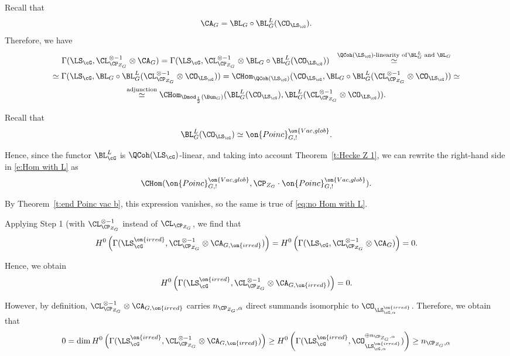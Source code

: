 \documentclass[9pt]{amsart}
\theoremstyle{remark}
\theoremstyle{definition}
\theoremstyle{remark}
\newcommand{\thmref}[1]{Theorem~\ref{#1}}
\numberwithin{equation}{section}
\begin{document}
\medskip 

Recall that
$$\CA_G = \BL_G\circ \BL_G^L(\CO_{\LS_\cG}).$$
Therefore, we have
\begin{multline} \label{e:Hom with L}
\Gamma(\LS_\cG,\CL^{\otimes -1}_{\CP_{Z_G}}\otimes \CA_G)=
\Gamma(\LS_\cG,\CL^{\otimes -1}_{\CP_{Z_G}}\otimes \BL_G\circ \BL_G^L(\CO_{\LS_\cG}))\,\,\,\,\overset{\QCoh(\LS_\cG)\text{-linearity of\,}\BL^L_G \text{ and } \BL_G}\simeq \\
\simeq \Gamma(\LS_\cG,\BL_G\circ \BL_G^L(\CL^{\otimes -1}_{\CP_{Z_G}}\otimes \CO_{\LS_\cG}))=
\CHom_{\QCoh(\LS_\cG)}(\CO_{\LS_\cG},\BL_G\circ \BL_G^L(\CL^{\otimes -1}_{\CP_{Z_G}}\otimes \CO_{\LS_\cG}))\simeq \\
\overset{\text{adjunction}}\simeq \CHom_{\Dmod_{\frac{1}{2}}(\Bun_G)}(\BL_G^L(\CO_{\LS_\cG}),\BL_G^L(\CL^{\otimes -1}_{\CP_{Z_G}}\otimes \CO_{\LS_\cG})).
\end{multline} 

Recall that 
$$\BL_G^L(\CO_{\LS_\cG})\simeq \on{Poinc}^{\on{Vac,glob}}_{G,!}.$$

Hence, since the functor $\BL^L_\cG$ is $\QCoh(\LS_\cG)$-linear, and taking into account
\thmref{t:Hecke Z 1}, we can rewrite the right-hand side in \eqref{e:Hom with L} as 
$$\CHom(\on{Poinc}^{\on{Vac,glob}}_{G,!},\CP_{Z_G}\cdot \on{Poinc}^{\on{Vac,glob}}_{G,!}).$$

By \thmref{t:end Poinc vac b}, this expression vanishes, so the same is true of
\eqref{eq:no Hom with L}.

\medskip

Applying Step 1 (with $\CL^{\otimes -1}_{\CP_{Z_G}}$ instead of $\CL_{\CP_{Z_G}}$, we find that
\[
H^0\left(\Gamma(\LS^{\on{irred}}_\cG,\CL^{\otimes -1}_{\CP_{Z_G}}\otimes \CA_{G,\on{irred}})\right)
= H^0\left(\Gamma(\LS_\cG,\CL^{\otimes -1}_{\CP_{Z_G}}\otimes \CA_G)\right) = 0.
\]

\medskip

Hence, we obtain 
$$H^0\left(\Gamma(\LS^{\on{irred}}_\cG,\CL^{\otimes -1}_{\CP_{Z_G}}\otimes \CA_{G,\on{irred}})\right)=0.$$

\medskip

However, by definition, $\CL^{\otimes -1}_{\CP_{Z_G}}\otimes \CA_{G,\on{irred}}$ 
carries $n_{\CP_{Z_G},\alpha}$ direct summands isomorphic to $\CO_{\LS_{\cG,\alpha}^{\on{irred}}}$.
Therefore, we obtain that
\[
0 = \dim H^0\left(\Gamma(\LS^{\on{irred}}_\cG,\CL^{\otimes -1}_{\CP_{Z_G}}\otimes \CA_{G,\on{irred}})\right) \geq 
H^0\left(\Gamma(\LS^{\on{irred}}_\cG,\CO_{\LS_{\cG,\alpha}^{\on{irred}}}^{\oplus n_{\CP_{Z_G},\alpha}})\right)
 \geq n_{\CP_{Z_G},\alpha}
\]
\end{document}

